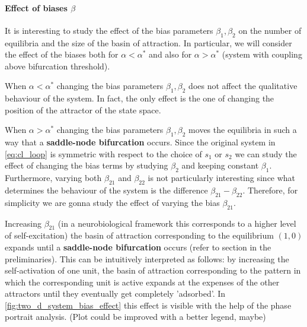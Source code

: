 \paragraph{Effect of biases $\beta$} It is interesting to study the effect of the bias parameters $\beta_1,\beta_2 $ on the number of equilibria and the size of the basin of attraction. In particular, we will consider the effect of the biases both for $\alpha<\alpha^* $ and also for $\alpha>\alpha^* $ (system with coupling above bifurcation threshold). 

When $\alpha<\alpha^*$ changing the bias parameters $\beta_1, \beta_2$ does not affect the qualitative behaviour of the system. In fact, the only effect is the one of changing the position of the attractor of the state space.

When $\alpha>\alpha^*$ changing the bias parameters $\beta_1, \beta_2$ moves the equilibria in such a way that a \textbf{saddle-node bifurcation} occurs.
Since the original system in \eqref{eq:cl_loop} is symmetric with respect to the choice of $s_1$ or $s_2$ we can study the effect of changing the bias terms by studying $\beta_2$ and keeping constant $\beta_1$. Furthermore, varying both $\beta_{21}$ and $\beta_{22}$ is not particularly interesting since what determines the behaviour of the system is the difference  $\beta_{21} - \beta_{22}$. Therefore, for simplicity we are gonna study the effect of varying the bias $\beta_{21}$. 

Increasing $\beta_{21}$ (in a neurobiological framework this corresponds to a higher level of self-excitation) the basin of attraction corresponding to the equilibrium $(1, 0)$ expands until a \textbf{saddle-node bifurcation} occurs (refer to section in the preliminaries). This can be intuitively interpreted as follows: by increasing the self-activation of one unit, the basin of attraction corresponding to the pattern in which the corresponding unit is active expands at the expenses of the other attractors until they eventually get completely 'adsorbed'. In \cref{fig:two_d_system_bias_effect} this effect is visible with the help of the phase portrait analysis. (Plot could be improved with a better legend, maybe)

